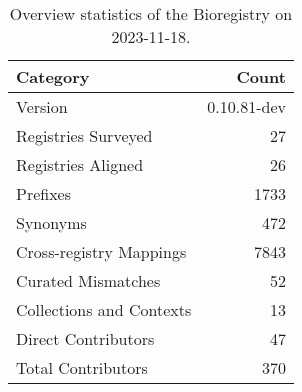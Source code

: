 \begin{table}
\caption{Overview statistics of the Bioregistry on 2023-11-18.}
\label{tab:bioregistry-summary}
\begin{tabular}{lr}
\toprule
Category & Count \\
\midrule
Version & 0.10.81-dev \\
Registries Surveyed & 27 \\
Registries Aligned & 26 \\
Prefixes & 1733 \\
Synonyms & 472 \\
Cross-registry Mappings & 7843 \\
Curated Mismatches & 52 \\
Collections and Contexts & 13 \\
Direct Contributors & 47 \\
Total Contributors & 370 \\
\bottomrule
\end{tabular}
\end{table}

